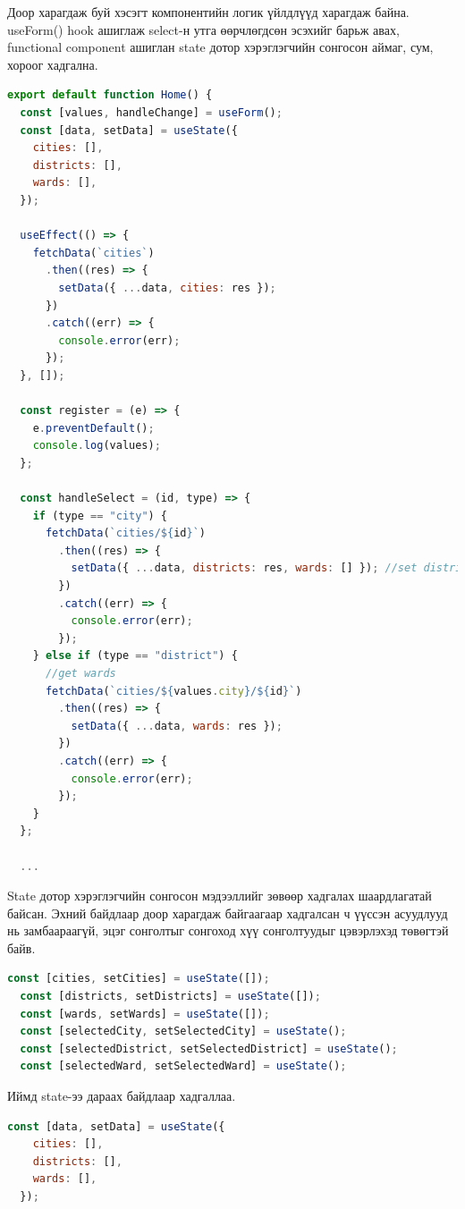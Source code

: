 Доор харагдаж буй хэсэгт компонентийн логик үйлдлүүд харагдаж байна. useForm() hook ашиглаж select-н утга өөрчлөгдсөн эсэхийг барьж авах, functional component ашиглан state дотор хэрэглэгчийн сонгосон аймаг, сум, хороог хадгална. 

\begin{lstlisting}[language=Javascript, caption=Component-н үндсэн логик үйлдлүүд, frame=single]
export default function Home() {
  const [values, handleChange] = useForm();
  const [data, setData] = useState({
    cities: [],
    districts: [],
    wards: [],
  });

  useEffect(() => {
    fetchData(`cities`)
      .then((res) => {
        setData({ ...data, cities: res });
      })
      .catch((err) => {
        console.error(err);
      });
  }, []);

  const register = (e) => {
    e.preventDefault();
    console.log(values);
  };

  const handleSelect = (id, type) => {
    if (type == "city") {
      fetchData(`cities/${id}`)
        .then((res) => {
          setData({ ...data, districts: res, wards: [] }); //set districts and clear wards data
        })
        .catch((err) => {
          console.error(err);
        });
    } else if (type == "district") {
      //get wards
      fetchData(`cities/${values.city}/${id}`)
        .then((res) => {
          setData({ ...data, wards: res });
        })
        .catch((err) => {
          console.error(err);
        });
    }
  };
  
  ...
\end{lstlisting}

State дотор хэрэглэгчийн сонгосон мэдээллийг зөвөөр хадгалах шаардлагатай байсан. Эхний байдлаар доор харагдаж байгаагаар хадгалсан ч үүссэн асуудлууд нь замбаараагүй, эцэг сонголтыг сонгоход хүү сонголтуудыг цэвэрлэхэд төвөгтэй байв.

\begin{lstlisting}[language=Javascript, caption=Дотоод төлвийн эхний хувилбар, frame=single]
	const [cities, setCities] = useState([]);
  const [districts, setDistricts] = useState([]);
  const [wards, setWards] = useState([]);
  const [selectedCity, setSelectedCity] = useState();
  const [selectedDistrict, setSelectedDistrict] = useState();
  const [selectedWard, setSelectedWard] = useState();
\end{lstlisting}

Иймд state-ээ дараах байдлаар хадгаллаа.

\begin{lstlisting}[language=Javascript, caption=Дотоод төлвийн сайжруулсан хувилбар, frame=single]
	const [data, setData] = useState({
    cities: [],
    districts: [],
    wards: [],
  });
\end{lstlisting}

